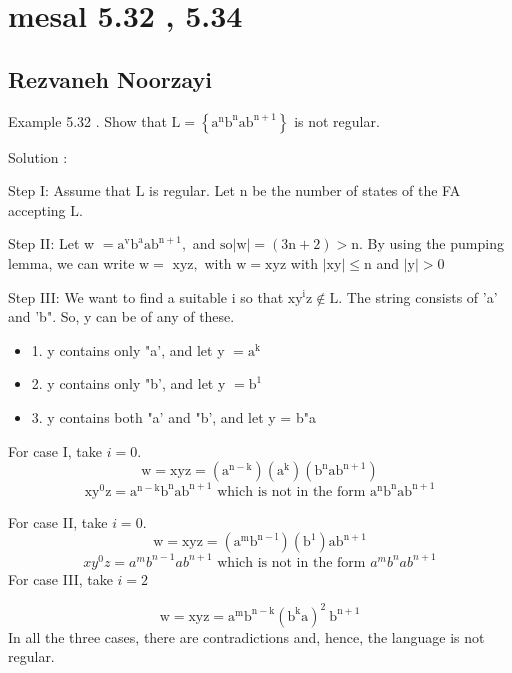 \documentclass [7pt]{beamer}
\begin{document}
\small
\section*{mesal 5.32 , 5.34}
\subsection*{Rezvaneh Noorzayi }	
\begin{frame}
\justifying	
Example 5.32 . Show that $\mathrm{L}=\left\{\mathrm{a}^{\mathrm{n}} \mathrm{b}^{\mathrm{n}} \mathrm{ab}^{\mathrm{n}+1}\right\}$ is not regular.
\begin{flushleft}
Solution :
\end{flushleft}
Step I: Assume that $\mathrm{L}$ is regular. Let $\mathrm{n}$ be the number of states of the FA accepting $\mathrm{L}$.
\begin{flushleft}
Step II: Let w $=\mathrm{a}^{\mathrm{v}} \mathrm{b}^{\mathrm{a}} \mathrm{ab}^{\mathrm{n}+1},$ and $\mathrm{so}|\mathrm{w}|=(3 \mathrm{n}+2)>\mathrm{n} .$ By using the pumping lemma, we can write $\mathrm{w}=$
$\mathrm{xyz},$ with $\mathrm{w}=\mathrm{xyz}$ with $|\mathrm{xy}| \leq \mathrm{n}$ and $|\mathrm{y}|>0$
\end{flushleft}
\begin{flushleft}
Step III: We want to find a suitable i so that $\mathrm{xy}^{\mathrm{i}} \mathrm{z} \notin \mathrm{L}$. The string consists of 'a' and 'b". So, y can be of any of these.
\end{flushleft}
\begin{itemize}
\item	
1. y contains only "a', and let y $=\mathrm{a}^{\mathrm{k}}$
\item
2. y contains only "b', and let y $=\mathrm{b}^{1}$
\item
3. y contains both "a' and "b', and let y = b"a
\end{itemize}
\justifying			
For case I, take $i=0$.
$$
\mathrm{w}=\mathrm{xyz}=\left(\mathrm{a}^{\mathrm{n}-\mathrm{k}}\right)\left(\mathrm{a}^{\mathrm{k}}\right)\left(\mathrm{b}^{\mathrm{n}} \mathrm{a} \mathrm{b}^{\mathrm{n}+1}\right)
$$
$$
\mathrm{xy}^{0} \mathrm{z}=\mathrm{a}^{\mathrm{n}-\mathrm{k}} \mathrm{b}^{\mathrm{n}} \mathrm{a} \mathrm{b}^{\mathrm{n}+1} \text { which is not in the form } \mathrm{a}^{\mathrm{n}} \mathrm{b}^{\mathrm{n}} \mathrm{ab}^{\mathrm{n} + {1}}
$$
\end{frame}
\begin{frame}	
For case II, take $i=0$.
$$\mathrm{w}=\mathrm{xyz}=\left(\mathrm{a}^{\mathrm{m}} \mathrm{b}^{\mathrm{n}-\mathrm{l}}\right)\left(\mathrm{b}^{\mathrm{1}}\right) \mathrm{a} \mathrm{b}^{\mathrm{n}+1}$$
$$x y^{0} z=a^{m} b^{n-1} a b^{n+1} \text { which is not in the form } a^{m} b^{n} a b^{n+1}$$
For case III, take $i=2$

$$\mathrm{w}=\mathrm{xyz}=\mathrm{a}^{\mathrm{m}} \mathrm{b}^{\mathrm{n}-\mathrm{k}}\left(\mathrm{b}^{\mathrm{k}} \mathrm{a}\right)^{2} \mathrm{~b}^{\mathrm{n}+1}$$
In all the three cases, there are contradictions and, hence, the language is not regular.
\end{frame}
\end{document}
